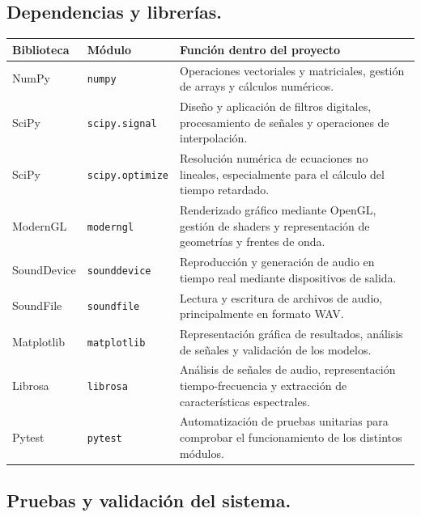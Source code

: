 \documentclass[10.5pt]{article}
\begin{document}
	\subsection{Dependencias y librerías.}
	
	\begin{table}[H]
		\centering
		\label{tab:dependencias}
		\begin{tabular}{|l|l|p{10cm}|}
			\hline
			\textbf{Biblioteca} & \textbf{Módulo} & \textbf{Función dentro del proyecto} \\ 
			\hline
			NumPy & \texttt{numpy} &
			Operaciones vectoriales y matriciales, gestión de arrays y cálculos numéricos. \\
			\hline
			SciPy & \texttt{scipy.signal} &
			Diseño y aplicación de filtros digitales, procesamiento de señales y operaciones de interpolación. \\
			\hline
			SciPy & \texttt{scipy.optimize} &
			Resolución numérica de ecuaciones no lineales, especialmente para el cálculo del tiempo retardado. \\
			\hline
			ModernGL & \texttt{moderngl} &
			Renderizado gráfico mediante OpenGL, gestión de shaders y representación de geometrías y frentes de onda. \\
			\hline
			SoundDevice & \texttt{sounddevice} &
			Reproducción y generación de audio en tiempo real mediante dispositivos de salida. \\
			\hline
			SoundFile & \texttt{soundfile} &
			Lectura y escritura de archivos de audio, principalmente en formato WAV. \\
			\hline
			Matplotlib & \texttt{matplotlib} &
			Representación gráfica de resultados, análisis de señales y validación de los modelos. \\
			\hline
			Librosa & \texttt{librosa} &
			Análisis de señales de audio, representación tiempo-frecuencia y extracción de características espectrales. \\
			\hline
			Pytest & \texttt{pytest} &
			Automatización de pruebas unitarias para comprobar el funcionamiento de los distintos módulos. \\
			\hline
		\end{tabular}
	\end{table}
	
	\subsection{Pruebas y validación del sistema.}
	
\end{document}
